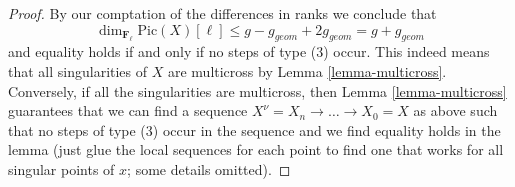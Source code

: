 \begin{proof}
By our comptation of the differences in ranks we conclude that
$$
\dim_{\mathbf{F}_\ell} \text{Pic}(X)[\ell] \leq
g - g_{geom} + 2g_{geom} = g + g_{geom}
$$
and equality holds if and only if no steps of type (3) occur.
This indeed means that all singularities of $X$ are multicross
by Lemma \ref{lemma-multicross}. Conversely, if all the singularities
are multicross, then Lemma \ref{lemma-multicross} guarantees that
we can find a sequence $X^\nu = X_n \to \ldots \to X_0 = X$
as above such that no steps of type (3) occur in the sequence
and we find equality holds in the lemma (just glue the local sequences
for each point to find one that works for all singular points of $x$;
some details omitted).
\end{proof}











